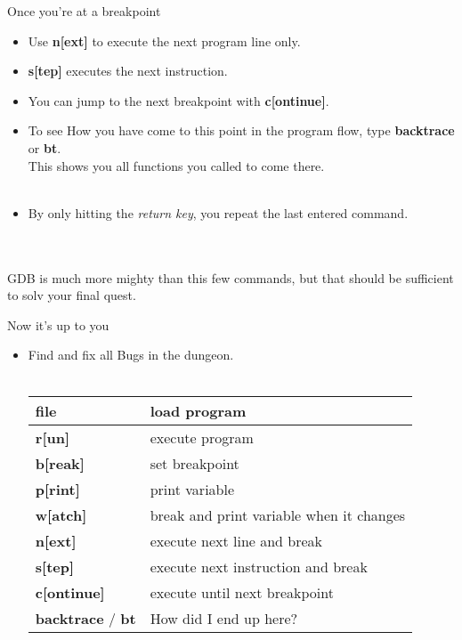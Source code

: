 \begin{frame}{Once you're at a breakpoint}
	\begin{itemize}
		\item Use \textbf{n[ext]} to execute the next program line only.
		\item \textbf{s[tep]} executes the next instruction.
		\item You can jump to the next breakpoint with \textbf{c[ontinue]}.
		\item To see How you have come to this point in the program flow, type \textbf{backtrace} or \textbf{bt}.\\
		This shows you all functions you called to come there.
		\\\ \\
		\item By only hitting the \textit{return key}, you repeat the last entered  command.
	\end{itemize}
	\ \\\ \\
	GDB is much more mighty than this few commands, but that should be sufficient to solv your final quest.
\end{frame}
\begin{frame}{Now it's up to you}
	\begin{itemize}
		\item Find and fix all Bugs in the dungeon.\\\ \\
		\begin{tabular}{|l|l|}
			\hline
			\textbf{file} & load program\\\hline
			\textbf{r[un]} & execute program\\\hline
			\textbf{b[reak]} & set breakpoint\\\hline
			\textbf{p[rint]} & print variable\\\hline
			\textbf{w[atch]} & break and print variable when it changes\\\hline
			\textbf{n[ext]} & execute next line and break\\\hline
			\textbf{s[tep]} & execute next instruction and break\\\hline
			\textbf{c[ontinue]} & execute until next breakpoint\\\hline
			\textbf{backtrace} / \textbf{bt} & How did I end up here?\\\hline
		\end{tabular}
	\end{itemize}
\end{frame}

